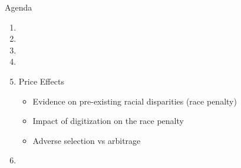 \documentclass[aspectratio=169,t,11pt,table]{beamer}
\begin{document}
\begin{frame}{Agenda}
  \begin{enumerate}
    \item {}
    \vspace{1mm}
    \item {}
    \vspace{1mm}
    \item {}
    \vspace{1mm}
          \item {}
    \vspace{1mm}
        \item Price Effects
        \begin{itemize}
        \item Evidence on pre-existing racial disparities (race penalty)
        \item Impact of digitization on the race penalty
        \item Adverse selection vs arbitrage
    \end{itemize}   
    \vspace{1mm}
    \item {}
  \end{enumerate}
   \vspace{2mm}
  \end{frame}
\end{document}

